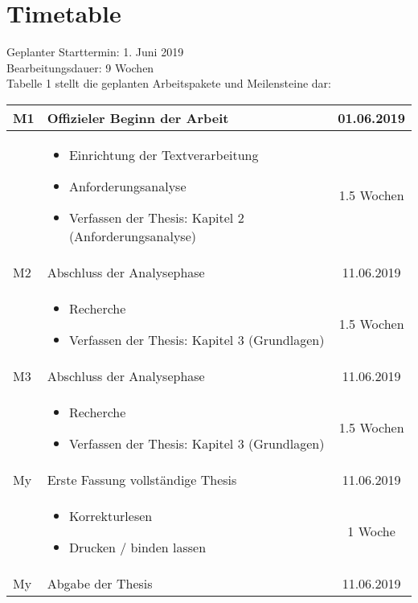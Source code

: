 \section{Timetable}
\label{sec:timetable}
\renewcommand{\arraystretch}{1.5}

Geplanter Starttermin: 1. Juni 2019 \\
Bearbeitungsdauer: 9 Wochen \\
Tabelle 1 stellt die geplanten Arbeitspakete und Meilensteine dar:
\\

	\begin{flushleft}
	    \begin{tabular}{ | l | p{10cm} | c |}
	    \hline
	    M1 & Offizieler Beginn der Arbeit & 01.06.2019 \\ 
	    \hline
	    & \begin{itemize}
            \item Einrichtung der Textverarbeitung
            \item Anforderungsanalyse
            \item Verfassen der Thesis: Kapitel 2 (Anforderungsanalyse)
	        \end{itemize} & 1.5 Wochen \\
		\hline
		M2 & Abschluss der Analysephase & 11.06.2019 \\ 
	    \hline
	    & \begin{itemize}
            \item Recherche
            \item Verfassen der Thesis: Kapitel 3 (Grundlagen)
	        \end{itemize} & 1.5 Wochen \\
	    \hline
	    M3 & Abschluss der Analysephase & 11.06.2019 \\ 
	    \hline
	    & \begin{itemize}
	    	\item Recherche
	    	\item Verfassen der Thesis: Kapitel 3 (Grundlagen)
	    \end{itemize} & 1.5 Wochen \\
		\hline
		My & Erste Fassung vollständige Thesis & 11.06.2019 \\ 
	    \hline
	    & \begin{itemize}
	    	\item Korrekturlesen
	    	\item Drucken / binden lassen
	    \end{itemize} & 1 Woche \\
		\hline
		My & Abgabe der Thesis & 11.06.2019 \\ 
		\hline
		\end{tabular}
	\end{flushleft}
